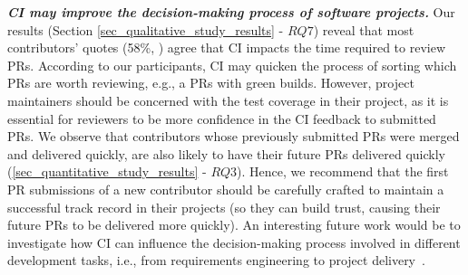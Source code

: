 {\em\bfseries CI may improve the decision-making process of software projects.} Our results (Section \ref{sec_qualitative_study_results} - $RQ7$) reveal that most contributors' quotes (58\%, ) agree that CI impacts the time required to review PRs. According to our participants, CI may quicken the process of sorting which PRs are worth reviewing, e.g., a PRs with green builds. However, project maintainers should be concerned with the test coverage in their project, as it is essential for reviewers to be more confidence in the CI feedback to submitted PRs. We observe that contributors whose previously submitted PRs were merged and delivered quickly, are also likely to have their future PRs delivered quickly (\ref{sec_quantitative_study_results} - $RQ3$).  Hence, we recommend that the first PR submissions of a new contributor should be carefully crafted to maintain a successful track record in their projects (so they can build trust, causing their future PRs to be delivered more quickly).
An interesting future work would be to investigate how CI can influence the decision-making process involved in different development tasks, i.e., from requirements engineering to project delivery~\citep{Sharma2021influence}. 
